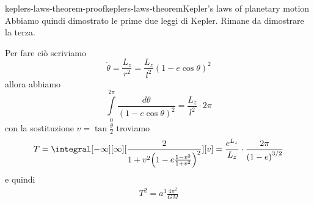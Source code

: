 \documentclass[preview]{standalone}
\begin{document}
\begin{snippetproof}{keplers-laws-theorem-proof}{keplers-laws-theorem}{Kepler's laws of planetary motion}
    Abbiamo quindi dimostrato le prime due leggi di Kepler.
    Rimane da dimostrare la terza.

    Per fare ciò scriviamo
    \[
        \dot\theta = \frac{L_z}{r^2} = \frac{L_z}{l^2}{(1-e\cos\theta)}^2
    \]
    allora abbiamo
    \[
        \int\limits_0^{2\pi} \frac{d\theta}{{(1-e\cos\theta)}^2}
        = \frac{L_z}{l^2} \cdot 2\pi
    \]
    con la sostituzione \(v = \tan \frac{\theta}{2}\) troviamo
    \[
        T = \integral[-\infty][\infty][\frac{2}{1 + v^2 {\left(1 - e \frac{1 - v^2}{1 + v^2}\right)}^2}][v]
        = \frac{e^{L_z}}{{L_z}} \cdot \frac{2\pi}{{(1-e)}^{3/2}}
    \]
    e quindi
    \begin{align*}
        T^2 = a^3 \frac{4\pi^2}{GM}
    \end{align*}
\end{snippetproof}
\end{document}
